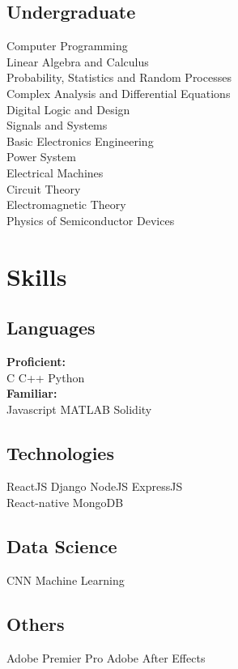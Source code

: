 \documentclass[]{deedy-resume-openfont}
\begin{document}
\begin{minipage}[t]{0.35\textwidth}
\subsection{Undergraduate}
Computer Programming \\
Linear Algebra and Calculus \\
Probability, Statistics and Random Processes \\
Complex Analysis and Differential Equations \\
Digital Logic and Design \\
Signals and Systems \\
Basic Electronics Engineering \\
Power System \\
Electrical Machines \\
Circuit Theory\\
Electromagnetic Theory\\
Physics of Semiconductor Devices \\
\sectionsep


\section{Skills}
\subsection{Languages}
\textbf{Proficient:}
\\\textbullet{} C \textbullet{}C++ \textbullet{} Python
\\\textbf{Familiar:}
\\\textbullet{} Javascript  \textbullet{} MATLAB \textbullet{} Solidity
\sectionsep
\subsection{Technologies}
\textbullet{} ReactJS  \textbullet{} Django \textbullet{} NodeJS \textbullet{} ExpressJS  \\ \textbullet{} React-native \textbullet{} MongoDB
\sectionsep
\subsection{Data Science}
\textbullet{} CNN
\textbullet{} Machine Learning
\sectionsep
\subsection{Others}
\textbullet{} Adobe Premier Pro  
\textbullet{} Adobe After Effects


\end{minipage}
\end{document}
